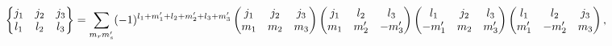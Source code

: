 \[\begin{Bmatrix}j_{1}&j_{2}&j_{3}\\
l_{1}&l_{2}&l_{3}\end{Bmatrix}=\sum_{m_{r}m^{\prime}_{s}}(-1)^{l_{1}+m^{\prime%
}_{1}+l_{2}+m^{\prime}_{2}+l_{3}+m^{\prime}_{3}}\*\begin{pmatrix}j_{1}&j_{2}&j%
_{3}\\
m_{1}&m_{2}&m_{3}\end{pmatrix}\begin{pmatrix}j_{1}&l_{2}&l_{3}\\
m_{1}&m^{\prime}_{2}&-m^{\prime}_{3}\end{pmatrix}\begin{pmatrix}l_{1}&j_{2}&l_%
{3}\\
-m^{\prime}_{1}&m_{2}&m^{\prime}_{3}\end{pmatrix}\begin{pmatrix}l_{1}&l_{2}&j_%
{3}\\
m^{\prime}_{1}&-m^{\prime}_{2}&m_{3}\end{pmatrix},\]